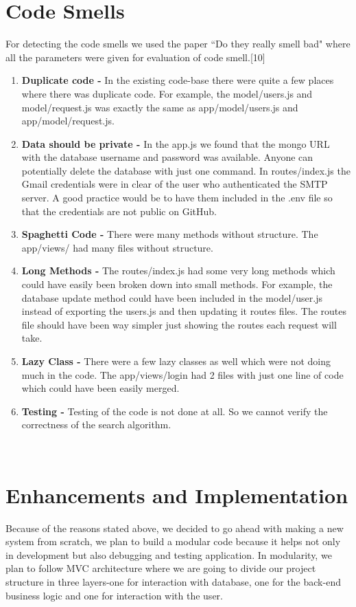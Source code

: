 \documentclass{sig-alternate-05-2015}
\begin{document}
\section{Code Smells}
For detecting the code smells we used the paper ``Do they really smell bad" where all the parameters were given for evaluation of code smell.[10]
\begin{enumerate}
\item \textbf{Duplicate code -} In the existing code-base there were quite a few places where there was duplicate code. For example, the model/users.js and model/request.js was exactly the same as app/model/users.js and app/model/request.js.
\item \textbf{Data should be private -} In the app.js we found that the mongo URL with the database username and password was available. Anyone can potentially delete the database with just one command. In routes/index.js the Gmail credentials were in clear of the user who authenticated the SMTP server. A good practice would be to have them included in the .env file so that the credentials are not public on GitHub.
\item \textbf{Spaghetti Code -} There were many methods without structure. The app/views/ had many files without structure.
\item \textbf{Long Methods -} The routes/index.js had some very long methods which could have easily been broken down into small methods. For example, the database update method could have been included in the model/user.js instead of exporting the users.js and then updating it routes files. The routes file should have been way simpler just showing the routes each request will take.
\item \textbf{Lazy Class -} There were a few lazy classes as well which were not doing much in the code. The app/views/login had 2 files with just one line of code which could have been easily merged. 
\item \textbf{Testing -} Testing of the code is not done at all. So we cannot verify the correctness of the search algorithm.
\end{enumerate}\\

\section{Enhancements and Implementation}
Because of the reasons stated above, we decided to go ahead with making a new system from scratch, we plan to build a modular code because it helps not only in development but also debugging and testing application. In modularity, we plan to follow MVC architecture where we are going to divide our project structure in three layers-one for interaction with database, one for the back-end business logic and one for interaction with the user. 
\\
\end{document}
